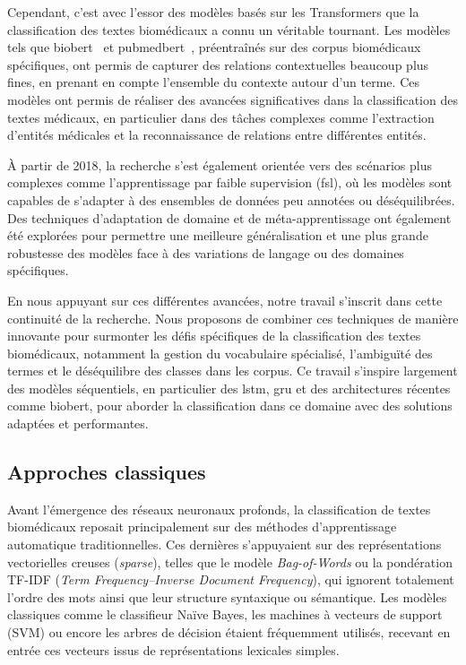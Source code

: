 \documentclass[12pt]{report}
\begin{document}
Cependant, c'est avec l'essor des modèles basés sur les Transformers que la classification des textes biomédicaux a connu un véritable tournant. Les modèles tels que \gls{biobert}~\cite{lee2020biobert} et \gls{pubmedbert}~\cite{gupta2021pubmedbert}, préentraînés sur des corpus biomédicaux spécifiques, ont permis de capturer des relations contextuelles beaucoup plus fines, en prenant en compte l’ensemble du contexte autour d’un terme. Ces modèles ont permis de réaliser des avancées significatives dans la classification des textes médicaux, en particulier dans des tâches complexes comme l'extraction d'entités médicales et la reconnaissance de relations entre différentes entités.

À partir de 2018, la recherche s’est également orientée vers des scénarios plus complexes comme l’apprentissage par faible supervision (\gls{fsl}), où les modèles sont capables de s'adapter à des ensembles de données peu annotées ou déséquilibrées. Des techniques d'adaptation de domaine et de méta-apprentissage ont également été explorées pour permettre une meilleure généralisation et une plus grande robustesse des modèles face à des variations de langage ou des domaines spécifiques.

En nous appuyant sur ces différentes avancées, notre travail s'inscrit dans cette continuité de la recherche. Nous proposons de combiner ces techniques de manière innovante pour surmonter les défis spécifiques de la classification des textes biomédicaux, notamment la gestion du vocabulaire spécialisé, l'ambiguïté des termes et le déséquilibre des classes dans les corpus. Ce travail s’inspire largement des modèles séquentiels, en particulier des \gls{lstm}, \gls{gru} et des architectures récentes comme \gls{biobert}, pour aborder la classification dans ce domaine avec des solutions adaptées et performantes.

\subsection{Approches classiques}

Avant l’émergence des réseaux neuronaux profonds, la classification de textes biomédicaux reposait principalement sur des méthodes d’apprentissage automatique traditionnelles. Ces dernières s’appuyaient sur des représentations vectorielles creuses (\textit{sparse}), telles que le modèle \textit{Bag-of-Words} ou la pondération TF-IDF (\textit{Term Frequency–Inverse Document Frequency}), qui ignorent totalement l’ordre des mots ainsi que leur structure syntaxique ou sémantique. Les modèles classiques comme le classifieur Naïve Bayes, les machines à vecteurs de support (SVM) ou encore les arbres de décision étaient fréquemment utilisés, recevant en entrée ces vecteurs issus de représentations lexicales simples.
\end{document}
